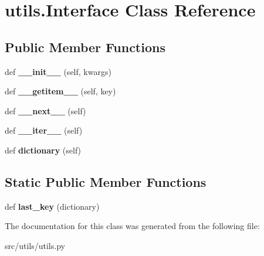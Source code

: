 \hypertarget{classutils_1_1Interface}{}\section{utils.\+Interface Class Reference}
\label{classutils_1_1Interface}
\subsection*{Public Member Functions}
\begin{DoxyCompactItemize}
\item 
def {\bfseries \+\_\+\+\_\+init\+\_\+\+\_\+} (self, kwargs)\hypertarget{classutils_1_1Interface_a8b95063a129db8d54005e05509bb10ef}{}\label{classutils_1_1Interface_a8b95063a129db8d54005e05509bb10ef}

\item 
def {\bfseries \+\_\+\+\_\+getitem\+\_\+\+\_\+} (self, key)\hypertarget{classutils_1_1Interface_a7b0232492feef2cd4e848dcc58e0f8c4}{}\label{classutils_1_1Interface_a7b0232492feef2cd4e848dcc58e0f8c4}

\item 
def {\bfseries \+\_\+\+\_\+next\+\_\+\+\_\+} (self)\hypertarget{classutils_1_1Interface_a62919668ead90f17fe08c88fdfb07e8f}{}\label{classutils_1_1Interface_a62919668ead90f17fe08c88fdfb07e8f}

\item 
def {\bfseries \+\_\+\+\_\+iter\+\_\+\+\_\+} (self)\hypertarget{classutils_1_1Interface_a504fdc18ad7d4ec0281d5b8b92061998}{}\label{classutils_1_1Interface_a504fdc18ad7d4ec0281d5b8b92061998}

\item 
def {\bfseries dictionary} (self)\hypertarget{classutils_1_1Interface_aa6384108e40c460afc316df970bccbe2}{}\label{classutils_1_1Interface_aa6384108e40c460afc316df970bccbe2}

\end{DoxyCompactItemize}
\subsection*{Static Public Member Functions}
\begin{DoxyCompactItemize}
\item 
def {\bfseries last\+\_\+key} (dictionary)\hypertarget{classutils_1_1Interface_abb5c706867e97a662b99c9ad82d52e98}{}\label{classutils_1_1Interface_abb5c706867e97a662b99c9ad82d52e98}

\end{DoxyCompactItemize}


The documentation for this class was generated from the following file\+:\begin{DoxyCompactItemize}
\item 
src/utils/utils.\+py\end{DoxyCompactItemize}
